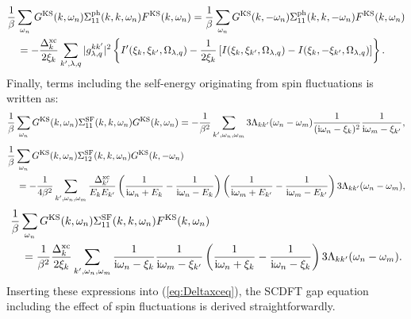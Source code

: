 %
\begin{equation}
	\begin{split}
	&\frac{1}{\beta} \sum_{\omega_n}G^{\rm KS}(k,\omega_n)\Sigma^{\rm ph}_{11}(k,k,\omega_n)F^{\rm KS}(k,\omega_n)
	=\frac{1}{\beta} \sum_{\omega_n}G^{\rm KS}(k,-\omega_n)\Sigma^{\rm ph}_{11}(k,k,-\omega_n)F^{\rm KS}(k,\omega_n)\\
	& \quad = -
	\frac{\Delta^{\rm xc}_{k}}{2\xi_{k}} \sum_{k',\lambda,q} |g^{kk'}_{\lambda,q}|^2
	\left\{ I'(\xi_k,\xi_{k'},\Omega_{\lambda,q})-\frac{1}{2\xi_k}
	\left[ I(\xi_k,\xi_{k'},\Omega_{\lambda,q}) - I(\xi_k,-\xi_{k'},\Omega_{\lambda,q}) \right]\right\}.
	\label{eq:ph11sum2}
	\end{split}
\end{equation}
%
Finally, terms including the self-energy originating from spin fluctuations is written as:
%
\begin{equation}
	\frac{1}{\beta} \sum_{\omega_n}G^{\rm KS}(k,\omega_n)\Sigma^{\rm SF}_{11}(k,k,\omega_n)G^{\rm KS}(k,\omega_n)
	= - \frac{1}{\beta^2}\sum_{k',\omega_n,\omega_m}
	3\Lambda_{kk'}(\omega_n-\omega_m)\frac{1}{({\rm i}\omega_n -\xi_{k})^2}\frac{1}{ {\rm i}\omega_m - \xi_{k'}},
	\label{eq:SF11sum1}
\end{equation}
%
\begin{equation}
	\begin{split}
	&\frac{1}{\beta} \sum_{\omega_n}G^{\rm KS}(k,\omega_n)\Sigma^{\rm SF}_{12}(k,k,\omega_n)G^{\rm KS}(k,-\omega_n)\\
	& \quad = -
	\frac{1}{4\beta^2}\sum_{k',\omega_n,\omega_m}\frac{\Delta^{\rm xc}_{k'}}{E_{k}E_{k'}}
	\left( \frac{1}{ {\rm i}\omega_n+E_k} - \frac{1}{ {\rm i}\omega_n-E_k} \right)
	\left( \frac{1}{ {\rm i}\omega_m+E_{k'}} - \frac{1}{ {\rm i}\omega_m-E_{k'}} \right)
	3\Lambda_{kk'}(\omega_n-\omega_m),
	\label{eq:SF12sum}
	\end{split}
\end{equation}
%
\begin{equation}
\begin{split}
	&\frac{1}{\beta} \sum_{\omega_n}G^{\rm KS}(k,\omega_n)\Sigma^{\rm SF}_{11}(k,k,\omega_n)F^{\rm KS}(k,\omega_n) \\
	&\quad =
	\frac{1}{\beta^2}\frac{\Delta^{\rm xc}_{k}}{2\xi_{k}}\sum_{k',\omega_n,\omega_m}
	\frac{1}{ {\rm i}\omega_n-\xi_k}\frac{1}{ {\rm i}\omega_m-\xi_{k'}}
	\left( \frac{1}{ {\rm i}\omega_n+\xi_k} - \frac{1}{ {\rm i}\omega_n-\xi_k} \right)
	3\Lambda_{kk'}(\omega_n-\omega_m).
	\label{eq:SF11sum2}
	\end{split}
\end{equation}
%
Inserting these expressions into (\ref{eq:Deltaxceq}), the SCDFT gap equation including the effect 
of spin fluctuations is derived straightforwardly.




